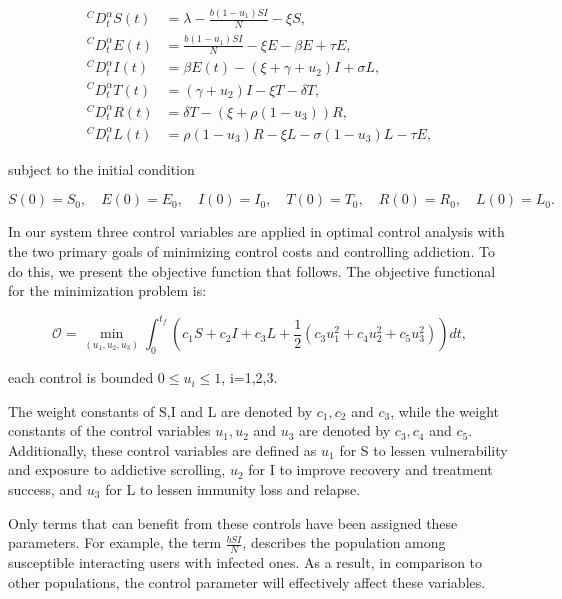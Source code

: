 \documentclass[10pt]{NSP1}
\begin{document}
\[
\begin{matrix}
^{C}D_{t}^{\alpha}S(t) & = \lambda - \frac{b\left( 1 - u_{1} \right)SI}{N} - \xi S, \\
^{C}D_{t}^{\alpha}E(t) & = \frac{b\left( 1 - u_{1} \right)SI}{N} - \xi E - \beta E + \tau E, \\
^{C}D_{t}^{\alpha}I(t) & = \beta E(t) - \left( \xi + \gamma + u_{2} \right)I + \sigma L, \\
^{C}D_{t}^{\alpha}T(t) & = \left( \gamma + u_{2} \right)I - \xi T - \delta T, \\
^{C}D_{t}^{\alpha}R(t) & = \delta T - \left( \xi + \rho\left( 1 - u_{3} \right) \right)R, \\
^{C}D_{t}^{\alpha}L(t) & = \rho\left( 1 - u_{3} \right)R - \xi L - \sigma\left( 1 - u_{3} \right)L - \tau E,
\end{matrix}
\]

subject to the initial condition

\[
S(0) = S_{0},\quad E(0) = E_{0},\quad I(0) = I_{0},\quad T(0) = T_{0},\quad R(0) = R_{0},\quad L(0) = L_{0}.
\]

In our system three control variables are applied in optimal control analysis with the two primary goals of minimizing control costs and controlling addiction. To do this, we present the objective function that follows. The objective functional for the minimization problem is:

\[
\mathcal{O} = \min_{\left( u_{1},u_{2},u_{3} \right)}\int_{0}^{t_{f}}\left( c_{1}S + c_{2}I + c_{3}L + \frac{1}{2}\left( c_{3}u_{1}^{2} + c_{4}u_{2}^{2} + c_{5}u_{3}^{2} \right) \right)dt,
\]

each control is bounded \(0 \leq u_{i} \leq 1\), i=1,2,3.

The weight constants of S,I and L are denoted by \(c_{1},c_{2}\) and \(c_{3}\), while the weight constants of the control variables \(u_{1},u_{2}\) and \(u_{3}\) are denoted by \(c_{3},c_{4}\) and \(c_{5}\). Additionally, these control variables are defined as \(u_{1}\) for S to lessen vulnerability and exposure to addictive scrolling, \(u_{2}\) for I to improve recovery and treatment success, and \(u_{3}\) for L to lessen immunity loss and relapse.

Only terms that can benefit from these controls have been assigned these parameters. For example, the term \(\frac{bSI}{N}\), describes the population among susceptible interacting users with infected ones. As a result, in comparison to other populations, the control parameter will effectively affect these variables.
\end{document}
